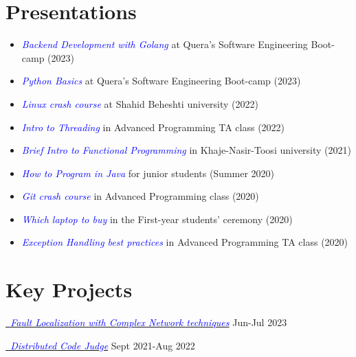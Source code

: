 \documentclass[11pt,a4paper,sans]{moderncv}
\begin{document}
\section{Presentations}
\begin{itemize}
\item \textit{\textcolor{blue}{Backend Development with Golang}} at Quera's Software Engineering Boot-camp (2023)
\item \textit{\textcolor{blue}{Python Basics}} at Quera's Software Engineering Boot-camp (2023)
\item \textit{\textcolor{blue}{Linux crash course}} at Shahid Beheshti university (2022)
\item \textit{\textcolor{blue}{Intro to Threading}} in Advanced Programming TA class (2022)
\item \textit{\textcolor{blue}{Brief Intro to Functional Programming}} in Khaje-Nasir-Toosi university (2021)
\item \textit{\textcolor{blue}{How to Program in Java}} for junior students (Summer 2020)
\item \textit{\textcolor{blue}{Git crash course}} in Advanced Programming class  (2020)
\item \textit{\textcolor{blue}{Which laptop to buy}} in the First-year students' ceremony (2020)
\item \textit{\textcolor{blue}{Exception Handling best practices}} in Advanced Programming TA class (2020)
\end{itemize}



\vspace{-0.5em}
\section{Key Projects}

{\textit{{\href{https://github.com/rsharifnasab/complex-network-fault-localization}{\textcolor{blue}{~Fault Localization with Complex Network techniques}}} }}{Jun-Jul 2023}{}{}


\vspace{-0.3mm}
{\textit{{\href{https://github.com/rsharifnasab/DJ}{\textcolor{blue}{~Distributed Code Judge}}}} }{Sept 2021-Aug 2022}{}{}
\end{document}
